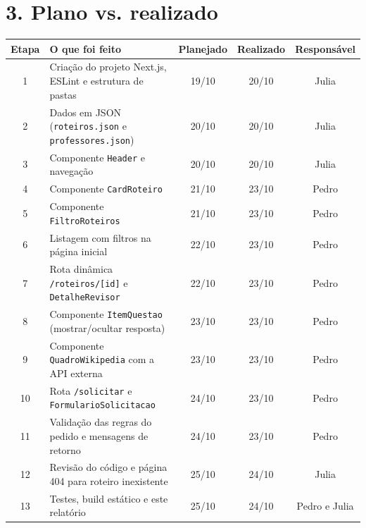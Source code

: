 \documentclass[10pt,a4paper]{article}
\begin{document}
\section*{3. Plano vs. realizado}
\vspace{2pt}
\noindent
\begin{tabularx}{\textwidth}{c X c c c}
\toprule
\textbf{Etapa} & \textbf{O que foi feito} & \textbf{Planejado} & \textbf{Realizado} & \textbf{Responsável} \\
\midrule
1 & Criação do projeto Next.js, ESLint e estrutura de pastas & 19/10 & 20/10 & Julia \\
2 & Dados em JSON (\texttt{roteiros.json} e \texttt{professores.json}) & 20/10 & 20/10 & Julia \\
3 & Componente \texttt{Header} e navegação & 20/10 & 20/10 & Julia \\
4 & Componente \texttt{CardRoteiro} & 21/10 & 23/10 & Pedro \\
5 & Componente \texttt{FiltroRoteiros} & 21/10 & 23/10 & Pedro \\
6 & Listagem com filtros na página inicial & 22/10 & 23/10 & Pedro \\
7 & Rota dinâmica \texttt{/roteiros/[id]} e \texttt{DetalheRevisor} & 22/10 & 23/10 & Pedro \\
8 & Componente \texttt{ItemQuestao} (mostrar/ocultar resposta) & 23/10 & 23/10 & Pedro \\
9 & Componente \texttt{QuadroWikipedia} com a API externa & 23/10 & 23/10 & Pedro \\
10 & Rota \texttt{/solicitar} e \texttt{FormularioSolicitacao} & 24/10 & 23/10 & Pedro \\
11 & Validação das regras do pedido e mensagens de retorno & 24/10 & 23/10 & Pedro \\
12 & Revisão do código e página 404 para roteiro inexistente & 25/10 & 24/10 & Julia \\
13 & Testes, build estático e este relatório & 25/10 & 24/10 & Pedro e Julia \\
\bottomrule
\end{tabularx}

\vspace{1pt}
\end{document}
